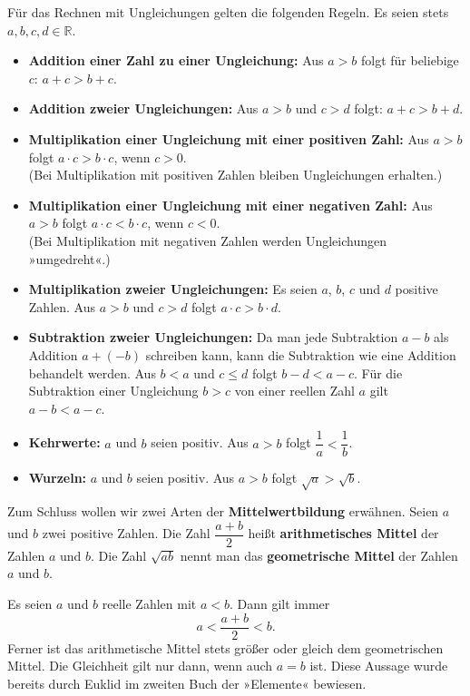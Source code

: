 Für das Rechnen mit Ungleichungen gelten die folgenden Regeln. Es seien stets $a, b, c, d \in \mathbb{R}$.
\begin{itemize}
  \item \textbf{Addition einer Zahl zu einer Ungleichung:} Aus $a > b$ folgt für beliebige $c$: $a + c > b + c$.
  \item \textbf{Addition zweier Ungleichungen:} Aus $a > b$ und $c > d$ folgt: $a + c > b + d$.
  \item \textbf{Multiplikation einer Ungleichung mit einer positiven Zahl:} Aus $a > b$ folgt $a \cdot c > b \cdot c$, wenn $c > 0$.\\
    (Bei Multiplikation mit positiven Zahlen bleiben Ungleichungen erhalten.)
  \item \textbf{Multiplikation einer Ungleichung mit einer negativen Zahl:} Aus $a > b$ folgt $a \cdot c < b \cdot c$, wenn $c < 0$.\\
    (Bei Multiplikation mit negativen Zahlen werden Ungleichungen »umgedreht«.)
  \item \textbf{Multiplikation zweier Ungleichungen:} Es seien $a$, $b$, $c$ und $d$ positive Zahlen. Aus $a > b$ und $c > d$ folgt $a \cdot c > b \cdot d$.
  \item \textbf{Subtraktion zweier Ungleichungen:} Da man jede Subtraktion $a - b$ als Addition $a + (-b)$ schreiben kann, kann die Subtraktion wie eine Addition behandelt werden. Aus $b < a$ und $c \leq d$ folgt $b - d < a - c$. Für die Subtraktion einer Ungleichung $b > c$ von einer reellen Zahl $a$ gilt $a - b < a - c$.
  \item \textbf{Kehrwerte:} $a$ und $b$ seien positiv. Aus $a > b$ folgt $\dfrac{1}{a} < \dfrac{1}{b}$.
  \item \textbf{Wurzeln:} $a$ und $b$ seien positiv. Aus $a > b$ folgt $\sqrt{a} > \sqrt{b}$.
\end{itemize}

Zum Schluss wollen wir zwei Arten der \textbf{Mittelwertbildung} erwähnen. Seien $a$ und $b$ zwei positive Zahlen. Die Zahl $\dfrac{a+b}{2}$ heißt \textbf{arithmetisches Mittel} der Zahlen $a$ und $b$. Die Zahl $\sqrt{ab}$ nennt man das \textbf{geometrische Mittel} der Zahlen $a$ und $b$.

Es seien $a$ und $b$ reelle Zahlen mit $a < b$. Dann gilt immer
\[ a < \frac{a+b}{2} < b . \]
Ferner ist das arithmetische Mittel stets größer oder gleich dem geometrischen Mittel. Die Gleichheit gilt nur dann, wenn auch $a = b$ ist. Diese Aussage wurde bereits durch Euklid im zweiten Buch der »Elemente« bewiesen.


